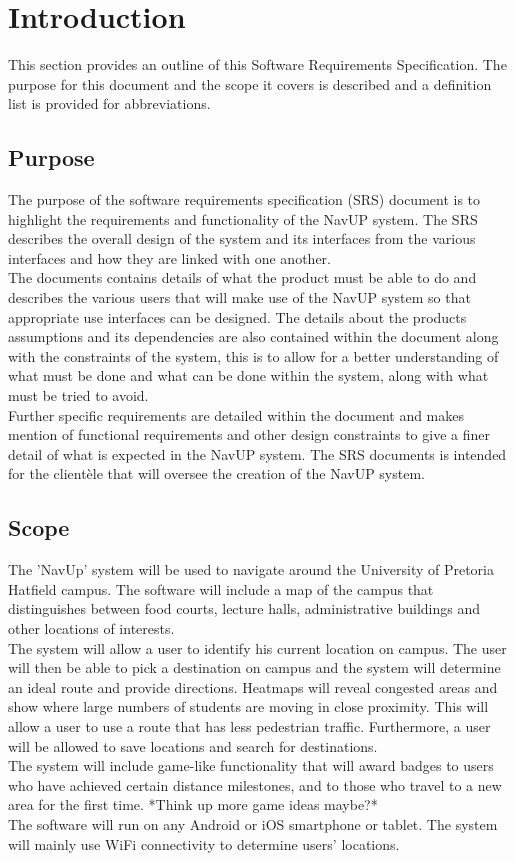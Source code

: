 \documentclass[a4paper,12pt]{article}
\begin{document}
\newpage
\section{Introduction}
This section provides an outline of this Software Requirements Specification. The purpose for this document and the scope it covers is described and a definition list is provided for abbreviations.
\subsection{Purpose}
The purpose of the software requirements specification (SRS) document is to highlight the requirements and functionality of the NavUP system. The SRS describes the overall design of the system and its interfaces from the various interfaces and how they are linked with one another.\\
The documents contains details of what the product must be able to do and describes the various users that will make use of the NavUP system so that appropriate use interfaces can be designed. The details about the products assumptions and its dependencies are also contained within the document along with the constraints of the system, this is to allow for a better understanding of what must be done and what can be done within the system, along with what must be tried to avoid.\\
Further specific requirements are detailed within the document and makes mention of functional requirements and other design constraints to give a finer detail of what is expected in the NavUP system. The SRS documents is intended for the clientèle that will oversee the creation of the NavUP system.\\
\subsection{Scope}
The 'NavUp' system will be used to navigate around the University of Pretoria Hatfield campus. The software will include a map of the campus that distinguishes between food courts, lecture halls, administrative buildings and other locations of interests.\\
The system will allow a user to identify his current location on campus. The user will then be able to pick a destination on campus and the system will determine an ideal route and provide directions. Heatmaps will reveal congested areas and show where large numbers of students are moving in close proximity. This will allow a user to use a route that has less pedestrian traffic. Furthermore, a user will be allowed to save locations and search for destinations.\\
The system will include game-like functionality that will award badges to users who have achieved certain distance milestones, and to those who travel to a new area for the first time. *Think up more game ideas maybe?*\\
The software will run on any Android or iOS smartphone or tablet. The system will mainly use WiFi connectivity to determine users' locations.
\end{document}
